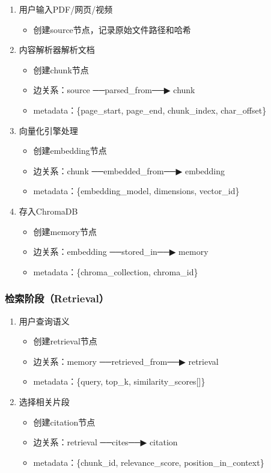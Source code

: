 \documentclass[12pt,a4paper,oneside]{article}
\begin{document}
\begin{enumerate}[\arabic*)]
    \item 用户输入PDF/网页/视频
    \begin{itemize}
        \item 创建source节点，记录原始文件路径和哈希
    \end{itemize}
    \item 内容解析器解析文档
    \begin{itemize}
        \item 创建chunk节点
        \item 边关系：source ──parsed\_from──▶ chunk
        \item metadata：\{page\_start, page\_end, chunk\_index, char\_offset\}
    \end{itemize}
    \item 向量化引擎处理
    \begin{itemize}
        \item 创建embedding节点
        \item 边关系：chunk ──embedded\_from──▶ embedding
        \item metadata：\{embedding\_model, dimensions, vector\_id\}
    \end{itemize}
    \item 存入ChromaDB
    \begin{itemize}
        \item 创建memory节点
        \item 边关系：embedding ──stored\_in──▶ memory
        \item metadata：\{chroma\_collection, chroma\_id\}
    \end{itemize}
\end{enumerate}

\subsubsection{检索阶段（Retrieval）}

\begin{enumerate}[\arabic*)]
    \item 用户查询语义
    \begin{itemize}
        \item 创建retrieval节点
        \item 边关系：memory ──retrieved\_from──▶ retrieval
        \item metadata：\{query, top\_k, similarity\_scores[]\}
    \end{itemize}
    \item 选择相关片段
    \begin{itemize}
        \item 创建citation节点
        \item 边关系：retrieval ──cites──▶ citation
        \item metadata：\{chunk\_id, relevance\_score, position\_in\_context\}
    \end{itemize}
\end{enumerate}
\end{document}
